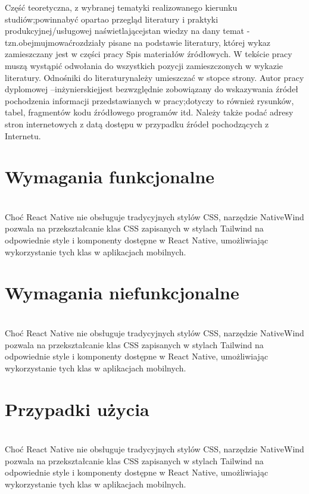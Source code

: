 Część teoretyczna, z wybranej tematyki realizowanego kierunku studiów;powinnabyć opartao przegląd literatury i praktyki produkcyjnej/usługowej naświetlającejstan wiedzy na dany temat -tzn.obejmujmowaćrozdziały pisane na podstawie literatury, której wykaz zamieszczany jest w części pracy Spis materiałów źródłowych. W tekście pracy muszą wystąpić odwołania do wszystkich pozycji zamieszczonych w wykazie literatury. Odnośniki do literaturynależy umieszczać w stopce strony. Autor pracy dyplomowej –inżynierskiejjest bezwzględnie zobowiązany do wskazywania źródeł pochodzenia informacji przedstawianych w pracy;dotyczy to również rysunków, tabel, fragmentów kodu źródłowego programów itd. Należy także podać adresy stron internetowych z datą dostępu w przypadku źródeł pochodzących z Internetu.

\phantom{Th} 

\section{Wymagania funkcjonalne}\\
Choć React Native nie obsługuje tradycyjnych stylów CSS, narzędzie NativeWind pozwala na przekształcanie klas CSS zapisanych w stylach Tailwind na odpowiednie style i komponenty dostępne w React Native, umożliwiając wykorzystanie tych klas w aplikacjach mobilnych.\\


\section{Wymagania niefunkcjonalne}\\
Choć React Native nie obsługuje tradycyjnych stylów CSS, narzędzie NativeWind pozwala na przekształcanie klas CSS zapisanych w stylach Tailwind na odpowiednie style i komponenty dostępne w React Native, umożliwiając wykorzystanie tych klas w aplikacjach mobilnych.\\


\section{Przypadki użycia}\\
Choć React Native nie obsługuje tradycyjnych stylów CSS, narzędzie NativeWind pozwala na przekształcanie klas CSS zapisanych w stylach Tailwind na odpowiednie style i komponenty dostępne w React Native, umożliwiając wykorzystanie tych klas w aplikacjach mobilnych.\\
